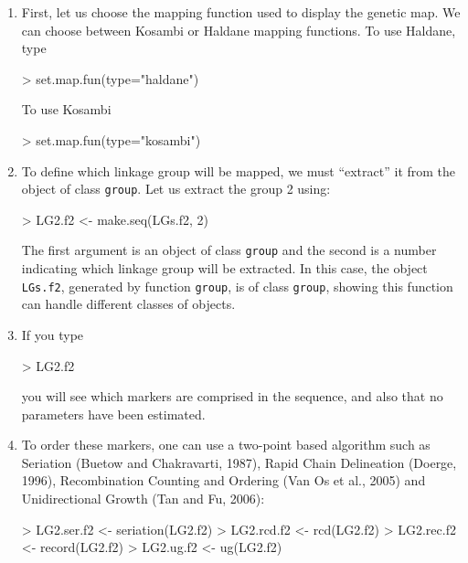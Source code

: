 \documentclass[letterpaper,12pt,oneside]{article}
\begin{document}
\begin{enumerate}

\item First, let us choose the mapping function used to display the genetic map. We can choose between Kosambi or Haldane mapping functions. To use Haldane, type
\begin{Schunk}
\begin{Sinput}
> set.map.fun(type="haldane")
\end{Sinput}
\end{Schunk}

To use Kosambi
\begin{Schunk}
\begin{Sinput}
> set.map.fun(type="kosambi")
\end{Sinput}
\end{Schunk}

\item To define which linkage group will be mapped, we must ``extract'' it from the object of class {\tt group}. Let us extract the group 2 using:

\begin{Schunk}
\begin{Sinput}
> LG2.f2 <- make.seq(LGs.f2, 2)
\end{Sinput}
\end{Schunk}

The first argument is an object of class {\tt group} and the second is a number indicating which linkage group will be extracted. In this case, the object {\tt LGs.f2}, generated by function {\tt group}, is of class {\tt group}, showing this function can handle different classes of objects.

\item If you type
\begin{Schunk}
\begin{Sinput}
> LG2.f2
\end{Sinput}
\end{Schunk}
you will see which markers are comprised in the sequence, and also that no parameters have been estimated.

\item To order these markers, one can use a two-point based algorithm such as Seriation (Buetow and Chakravarti, 1987), Rapid Chain Delineation (Doerge, 1996), Recombination Counting and Ordering (Van Os et al., 2005) and Unidirectional Growth (Tan and Fu, 2006):
  
\begin{Schunk}
\begin{Sinput}
> LG2.ser.f2 <- seriation(LG2.f2)
> LG2.rcd.f2 <- rcd(LG2.f2)
> LG2.rec.f2 <- record(LG2.f2)
> LG2.ug.f2 <- ug(LG2.f2)
\end{Sinput}
\end{Schunk}


\end{enumerate}
\end{document}
